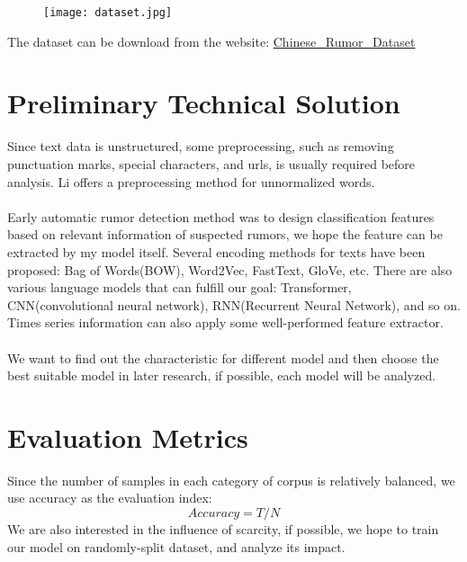 \documentclass{article}
\begin{document}
\begin{figure}[ht]
	\centering  
	\texttt{[image: dataset.jpg]}  
\end{figure}
The dataset can be download from the website: \href{https://github.com/thunlp/Chinese_Rumor_Dataset}{Chinese\_Rumor\_Dataset}

\section{Preliminary Technical Solution}
Since text data is unstructured, some preprocessing, such as removing punctuation marks, special characters, and urls, is usually required before analysis. Li offers a preprocessing method for unnormalized words.\cite{litwitter}
\\ \hspace*{\fill} \\
Early automatic rumor detection method was to design classification features based on relevant information of suspected rumors, we hope the feature can be extracted by my model itself. Several encoding methods for texts have been proposed: Bag of Words(BOW), Word2Vec, FastText, GloVe, etc. There are also various language models that can fulfill our goal: Transformer, CNN(convolutional neural network), RNN(Recurrent Neural Network), and so on. Times series information can also apply some well-performed feature extractor.
\\ \hspace*{\fill} \\
We want to find out the characteristic for different model and then choose the best suitable model in later research, if possible, each model will be analyzed.

\section{Evaluation Metrics}
Since the number of samples in each category of corpus is relatively balanced, we use accuracy as the evaluation index:
\[Accuracy=T/N\]
We are also interested in the influence of scarcity, if possible, we hope to train our model on randomly-split dataset, and analyze its impact.


 
\end{document}
